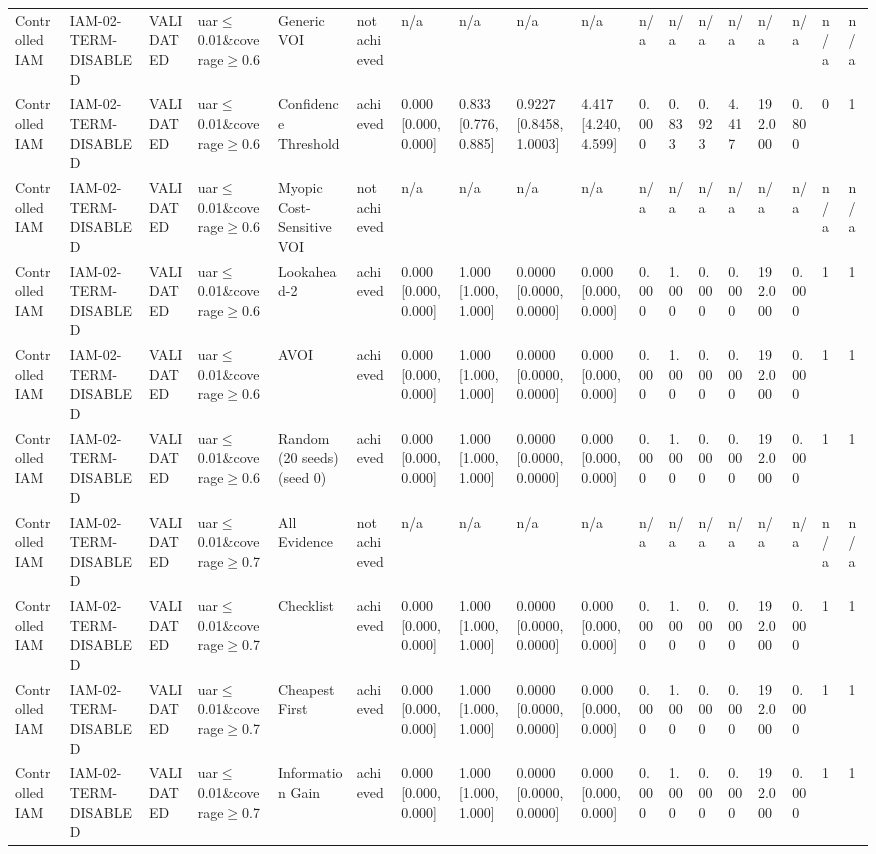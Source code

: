 \begin{table}[!ht]
{\begin{tabular}{llllllllllllllllll}
Controlled IAM & IAM-02-TERM-DISABLED & VALIDATED & uar$\le$0.01\&coverage$\ge$0.6 & Generic VOI & not achieved & n/a & n/a & n/a & n/a & n/a & n/a & n/a & n/a & n/a & n/a & n/a & n/a \\
Controlled IAM & IAM-02-TERM-DISABLED & VALIDATED & uar$\le$0.01\&coverage$\ge$0.6 & Confidence Threshold & achieved & 0.000 [0.000, 0.000] & 0.833 [0.776, 0.885] & 0.9227 [0.8458, 1.0003] & 4.417 [4.240, 4.599] & 0.000 & 0.833 & 0.923 & 4.417 & 192.000 & 0.800 & 0 & 1 \\
Controlled IAM & IAM-02-TERM-DISABLED & VALIDATED & uar$\le$0.01\&coverage$\ge$0.6 & Myopic Cost-Sensitive VOI & not achieved & n/a & n/a & n/a & n/a & n/a & n/a & n/a & n/a & n/a & n/a & n/a & n/a \\
Controlled IAM & IAM-02-TERM-DISABLED & VALIDATED & uar$\le$0.01\&coverage$\ge$0.6 & Lookahead-2 & achieved & 0.000 [0.000, 0.000] & 1.000 [1.000, 1.000] & 0.0000 [0.0000, 0.0000] & 0.000 [0.000, 0.000] & 0.000 & 1.000 & 0.000 & 0.000 & 192.000 & 0.000 & 1 & 1 \\
Controlled IAM & IAM-02-TERM-DISABLED & VALIDATED & uar$\le$0.01\&coverage$\ge$0.6 & AVOI & achieved & 0.000 [0.000, 0.000] & 1.000 [1.000, 1.000] & 0.0000 [0.0000, 0.0000] & 0.000 [0.000, 0.000] & 0.000 & 1.000 & 0.000 & 0.000 & 192.000 & 0.000 & 1 & 1 \\
Controlled IAM & IAM-02-TERM-DISABLED & VALIDATED & uar$\le$0.01\&coverage$\ge$0.6 & Random (20 seeds) (seed 0) & achieved & 0.000 [0.000, 0.000] & 1.000 [1.000, 1.000] & 0.0000 [0.0000, 0.0000] & 0.000 [0.000, 0.000] & 0.000 & 1.000 & 0.000 & 0.000 & 192.000 & 0.000 & 1 & 1 \\
Controlled IAM & IAM-02-TERM-DISABLED & VALIDATED & uar$\le$0.01\&coverage$\ge$0.7 & All Evidence & not achieved & n/a & n/a & n/a & n/a & n/a & n/a & n/a & n/a & n/a & n/a & n/a & n/a \\
Controlled IAM & IAM-02-TERM-DISABLED & VALIDATED & uar$\le$0.01\&coverage$\ge$0.7 & Checklist & achieved & 0.000 [0.000, 0.000] & 1.000 [1.000, 1.000] & 0.0000 [0.0000, 0.0000] & 0.000 [0.000, 0.000] & 0.000 & 1.000 & 0.000 & 0.000 & 192.000 & 0.000 & 1 & 1 \\
Controlled IAM & IAM-02-TERM-DISABLED & VALIDATED & uar$\le$0.01\&coverage$\ge$0.7 & Cheapest First & achieved & 0.000 [0.000, 0.000] & 1.000 [1.000, 1.000] & 0.0000 [0.0000, 0.0000] & 0.000 [0.000, 0.000] & 0.000 & 1.000 & 0.000 & 0.000 & 192.000 & 0.000 & 1 & 1 \\
Controlled IAM & IAM-02-TERM-DISABLED & VALIDATED & uar$\le$0.01\&coverage$\ge$0.7 & Information Gain & achieved & 0.000 [0.000, 0.000] & 1.000 [1.000, 1.000] & 0.0000 [0.0000, 0.0000] & 0.000 [0.000, 0.000] & 0.000 & 1.000 & 0.000 & 0.000 & 192.000 & 0.000 & 1 & 1 \\

\end{tabular}}
\end{table}
